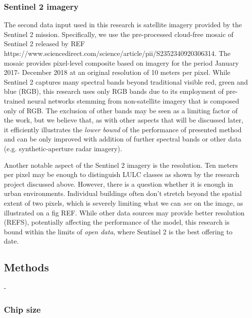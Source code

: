 


\subsubsection{Sentinel 2 imagery}


The second data input used in this research is satellite imagery provided by the Sentinel 2 mission. Specifically, we use the pre-processed cloud-free mosaic of Sentinel 2 released by {REF https://www.sciencedirect.com/science/article/pii/S2352340920306314}. The mosaic provides pixel-level composite based on imagery for the period January 2017- December 2018 at an original resolution of 10 meters per pixel. While Sentinel 2 captures many spectral bands beyond traditional visible red, green and blue (RGB),  this research uses only RGB bands due to its employment of pre-trained neural networks stemming from non-satellite imagery that is composed only of RGB. The exclusion of other bands may be seen as a limiting factor of the work, but we believe that, as with other aspects that will be discussed later, it efficiently illustrates the \textit{lower bound} of the performance of presented method and can be only improved with addition of further spectral bands or other data (e.g. synthetic-aperture radar imagery).

Another notable aspect of the Sentinel 2 imagery is the resolution. Ten meters per pixel may be enough to distinguish LULC classes as shown by the research project discussed above. However, there is a question whether it is enough in urban environments. Individual buildings often don't stretch beyond the spatial extent of two pixels, which is severely limiting what we can \textit{see} on the image, as illustrated on a fig REF. While other data sources may provide better resolution (REFS), potentially affecting the performance of the model, this research is bound within the limits of \textit{open data}, where Sentinel 2 is the best offering to date.


\subsection{Methods}


-

\subsubsection{Chip size}

